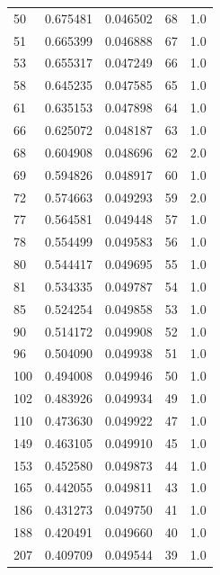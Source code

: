 \documentclass[
  12pt,
  letterpaper,
  DIV=11,
  numbers=noendperiod,
  onepage,
  openany]{scrreprt}
\begin{document}
\begin{tabular}{lrrrr}
50   &   0.675481 &      0.046502 &           68 &         1.0 \\
51   &   0.665399 &      0.046888 &           67 &         1.0 \\
53   &   0.655317 &      0.047249 &           66 &         1.0 \\
58   &   0.645235 &      0.047585 &           65 &         1.0 \\
61   &   0.635153 &      0.047898 &           64 &         1.0 \\
66   &   0.625072 &      0.048187 &           63 &         1.0 \\
68   &   0.604908 &      0.048696 &           62 &         2.0 \\
69   &   0.594826 &      0.048917 &           60 &         1.0 \\
72   &   0.574663 &      0.049293 &           59 &         2.0 \\
77   &   0.564581 &      0.049448 &           57 &         1.0 \\
78   &   0.554499 &      0.049583 &           56 &         1.0 \\
80   &   0.544417 &      0.049695 &           55 &         1.0 \\
81   &   0.534335 &      0.049787 &           54 &         1.0 \\
85   &   0.524254 &      0.049858 &           53 &         1.0 \\
90   &   0.514172 &      0.049908 &           52 &         1.0 \\
96   &   0.504090 &      0.049938 &           51 &         1.0 \\
100  &   0.494008 &      0.049946 &           50 &         1.0 \\
102  &   0.483926 &      0.049934 &           49 &         1.0 \\
110  &   0.473630 &      0.049922 &           47 &         1.0 \\
149  &   0.463105 &      0.049910 &           45 &         1.0 \\
153  &   0.452580 &      0.049873 &           44 &         1.0 \\
165  &   0.442055 &      0.049811 &           43 &         1.0 \\
186  &   0.431273 &      0.049750 &           41 &         1.0 \\
188  &   0.420491 &      0.049660 &           40 &         1.0 \\
207  &   0.409709 &      0.049544 &           39 &         1.0 \\

\end{tabular}
\end{document}
